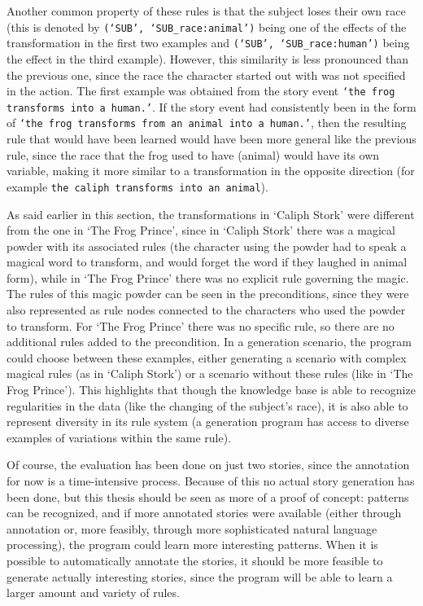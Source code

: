 Another common property of these rules is that the subject loses their own race
(this is denoted by \texttt{(`SUB', `SUB\_race:animal')} being one of the
effects of the transformation in the first two examples and 
\texttt{(`SUB', `SUB\_race:human')} being the effect in the third example). However, this similarity is
less pronounced than the previous one, since the race the character started out
with was not specified in the action. The first example was obtained from the
story event \texttt{`the frog transforms into a human.'}. If the story event had
consistently been in the form of \texttt{`the
frog transforms from an animal into a human.'}, then the resulting rule that
would have been learned would have been more general like the previous rule, 
since the race that the frog used to have (animal) would have its own variable,
making it more similar to a transformation in the opposite direction (for
example \texttt{the caliph transforms into an animal}).

As said earlier in this section, the transformations in `Caliph Stork' were different from the one in `The Frog
Prince', since in `Caliph Stork' there was a magical powder with its associated
rules (the character using the powder had to speak a magical word to transform, and would forget the
word if they laughed in animal form), while in `The Frog Prince' there was no
explicit rule governing the magic. The rules of this magic powder can be seen in
the preconditions, since they were also represented as rule nodes connected to
the characters who used the powder to transform. For `The Frog Prince' there was no
specific rule, so there are no additional rules added to the precondition. In a
generation scenario, the program could choose between these examples, either
generating a scenario with complex magical rules (as in `Caliph Stork') or a 
scenario without these rules (like in `The Frog Prince').
This highlights that
though the knowledge base is able to recognize regularities in the data (like
the changing of the subject's race), it is also able to represent diversity in
its rule system (a generation program has access to diverse examples of
variations within the same rule).

Of course, the evaluation has been done on just two stories, since the
annotation for now is a time-intensive process. Because of this no actual story
generation has been done, but this thesis should be seen as more of a proof of
concept: patterns can be recognized, and if more annotated stories were
available (either through annotation or, more feasibly, through more
sophisticated natural language processing), the program could learn more interesting patterns. When it is
possible to automatically annotate the stories, it should be more feasible to
generate actually interesting stories, since the program will be able to learn a
larger amount and variety of rules.
